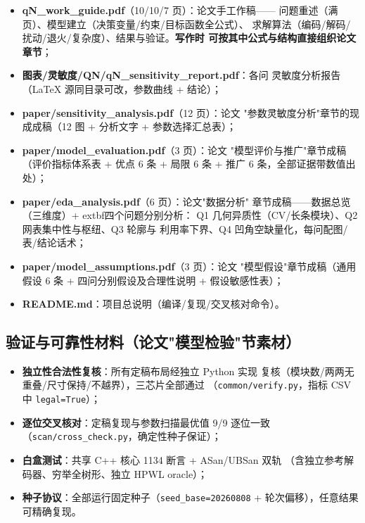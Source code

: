 \documentclass[12pt,a4paper]{article}
\begin{document}
\begin{itemize}
    \item \textbf{qN\_work\_guide.pdf}（10/10/7 页）：论文手工作稿——
    问题重述（满页）、模型建立（决策变量/约束/目标函数全公式）、
    求解算法（编码/解码/扰动/退火/复杂度）、结果与验证。\textbf{写作时
    可按其中公式与结构直接组织论文章节}；
    \item \textbf{图表/灵敏度/QN/qN\_sensitivity\_report.pdf}：各问
    灵敏度分析报告（LaTeX 源同目录可改，参数曲线 + 结论）；
    \item \textbf{paper/sensitivity\_analysis.pdf}（12 页）：论文
    "参数灵敏度分析"章节的现成成稿（12 图 + 分析文字 + 参数选择汇总表）；
    \item \textbf{paper/model\_evaluation.pdf}（3 页）：论文
    "模型评价与推广"章节成稿（评价指标体系表 + 优点 6 条 + 局限 6 条 +
    推广 6 条，全部证据带数值出处）；
    \item \textbf{paper/eda\_analysis.pdf}（6 页）：论文"数据分析"
    章节成稿——数据总览（三维度）+ 	extbf{四个问题分别分析}：
    Q1 几何异质性（CV/长条模块）、Q2 网表集中性与枢纽、Q3 轮廓与
    利用率下界、Q4 凹角空缺量化，每问配图/表/结论话术；
    \item \textbf{paper/model\_assumptions.pdf}（3 页）：论文
    "模型假设"章节成稿（通用假设 6 条 + 四问分别假设及合理性说明 +
    假设敏感性表）；
    \item \textbf{README.md}：项目总说明（编译/复现/交叉核对命令）。
\end{itemize}

\subsection{验证与可靠性材料（论文"模型检验"节素材）}

\begin{itemize}
    \item \textbf{独立性合法性复核}：所有定稿布局经独立 Python 实现
    复核（模块数/两两无重叠/尺寸保持/不越界），三芯片全部通过
    （\texttt{common/verify.py}，指标 CSV 中 \texttt{legal=True}）；
    \item \textbf{逐位交叉核对}：定稿复现与参数扫描最优值 9/9 逐位一致
    （\texttt{scan/cross\_check.py}，确定性种子保证）；
    \item \textbf{白盒测试}：共享 C++ 核心 1134 断言 + ASan/UBSan 双轨
    （含独立参考解码器、穷举全树形、独立 HPWL oracle）；
    \item \textbf{种子协议}：全部运行固定种子（\texttt{seed\_base=20260808}
    + 轮次偏移），任意结果可精确复现。
\end{itemize}
\end{document}
